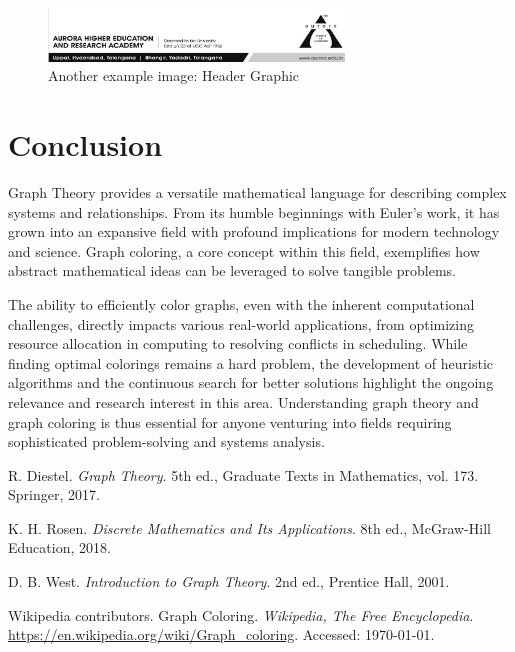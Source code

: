 \documentclass[11pt, a4paper]{article}
\begin{document}
\begin{figure}[h!]
    \centering
    \includegraphics[width=0.7\textwidth]{header.png}
    \caption{Another example image: Header Graphic}
    \label{fig:header_graphic}
\end{figure}

\section{Conclusion}
Graph Theory provides a versatile mathematical language for describing complex systems and relationships. From its humble beginnings with Euler's work, it has grown into an expansive field with profound implications for modern technology and science. Graph coloring, a core concept within this field, exemplifies how abstract mathematical ideas can be leveraged to solve tangible problems.

The ability to efficiently color graphs, even with the inherent computational challenges, directly impacts various real-world applications, from optimizing resource allocation in computing to resolving conflicts in scheduling. While finding optimal colorings remains a hard problem, the development of heuristic algorithms and the continuous search for better solutions highlight the ongoing relevance and research interest in this area. Understanding graph theory and graph coloring is thus essential for anyone venturing into fields requiring sophisticated problem-solving and systems analysis.

\newpage
\begin{thebibliography}{99} %
    R. Diestel. \textit{Graph Theory}. 5th ed., Graduate Texts in Mathematics, vol. 173. Springer, 2017.

    K. H. Rosen. \textit{Discrete Mathematics and Its Applications}. 8th ed., McGraw-Hill Education, 2018.

    D. B. West. \textit{Introduction to Graph Theory}. 2nd ed., Prentice Hall, 2001.

    Wikipedia contributors. Graph Coloring. \textit{Wikipedia, The Free Encyclopedia}. \url{https://en.wikipedia.org/wiki/Graph_coloring}. Accessed: \today.
\end{thebibliography}
\end{document}

